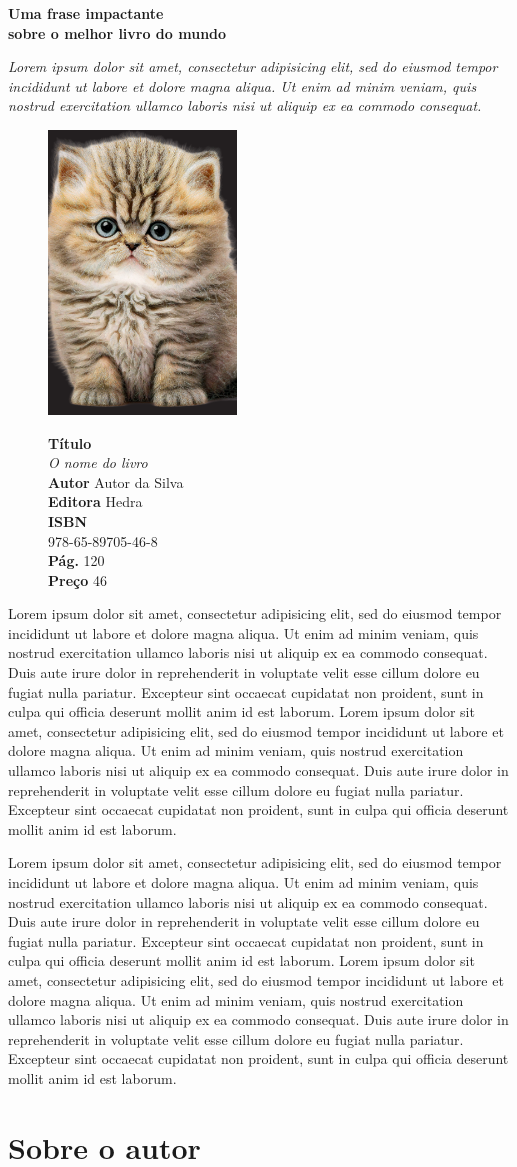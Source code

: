 \documentclass[11pt,a4paper]{article}
\newcommand{\maintitle}[1]{%
\noindent\begin{minipage}{11cm}
{\LARGE\bfseries #1}\bigskip
\end{minipage}
}
\newcommand{\linhafina}[1]{%
\noindent\begin{minipage}{11cm}
{\itshape #1}
\end{minipage}
}
\newcommand{\bookinfo}[6]{%
\begin{figure}
\includegraphics[width=50mm]{./THUMB.pdf}
\smallskip

\textbf{Título}\\ \textit{#1}\\
\textbf{Autor} #2\\
\textbf{Editora} #3\\
\textbf{ISBN}\\ #4\\
\textbf{Pág.} #5\\
\textbf{Preço} #6
\end{figure}
}
\begin{document}
\maintitle{Uma frase impactante\\ sobre o melhor livro do mundo}

\linhafina{
Lorem ipsum dolor sit amet, consectetur adipisicing elit, sed do eiusmod
tempor incididunt ut labore et dolore magna aliqua. Ut enim ad minim veniam,
quis nostrud exercitation ullamco laboris nisi ut aliquip ex ea commodo
consequat.}
 

\vspace{1cm}

\bookinfo{O nome do livro}{Autor da Silva}{Hedra}{978-65-89705-46-8}{120}{46}

\noindent 
Lorem ipsum dolor sit amet, consectetur adipisicing elit, sed do eiusmod
tempor incididunt ut labore et dolore magna aliqua. Ut enim ad minim veniam,
quis nostrud exercitation ullamco laboris nisi ut aliquip ex ea commodo
consequat. Duis aute irure dolor in reprehenderit in voluptate velit esse
cillum dolore eu fugiat nulla pariatur. Excepteur sint occaecat cupidatat non
proident, sunt in culpa qui officia deserunt mollit anim id est laborum.
Lorem ipsum dolor sit amet, consectetur adipisicing elit, sed do eiusmod
tempor incididunt ut labore et dolore magna aliqua. Ut enim ad minim veniam,
quis nostrud exercitation ullamco laboris nisi ut aliquip ex ea commodo
consequat. Duis aute irure dolor in reprehenderit in voluptate velit esse
cillum dolore eu fugiat nulla pariatur. Excepteur sint occaecat cupidatat non
proident, sunt in culpa qui officia deserunt mollit anim id est laborum.


Lorem ipsum dolor sit amet, consectetur adipisicing elit, sed do eiusmod
tempor incididunt ut labore et dolore magna aliqua. Ut enim ad minim veniam,
quis nostrud exercitation ullamco laboris nisi ut aliquip ex ea commodo
consequat. Duis aute irure dolor in reprehenderit in voluptate velit esse
cillum dolore eu fugiat nulla pariatur. Excepteur sint occaecat cupidatat non
proident, sunt in culpa qui officia deserunt mollit anim id est laborum.
Lorem ipsum dolor sit amet, consectetur adipisicing elit, sed do eiusmod
tempor incididunt ut labore et dolore magna aliqua. Ut enim ad minim veniam,
quis nostrud exercitation ullamco laboris nisi ut aliquip ex ea commodo
consequat. Duis aute irure dolor in reprehenderit in voluptate velit esse
cillum dolore eu fugiat nulla pariatur. Excepteur sint occaecat cupidatat non
proident, sunt in culpa qui officia deserunt mollit anim id est laborum.
\section{Sobre o autor}
\end{document}
